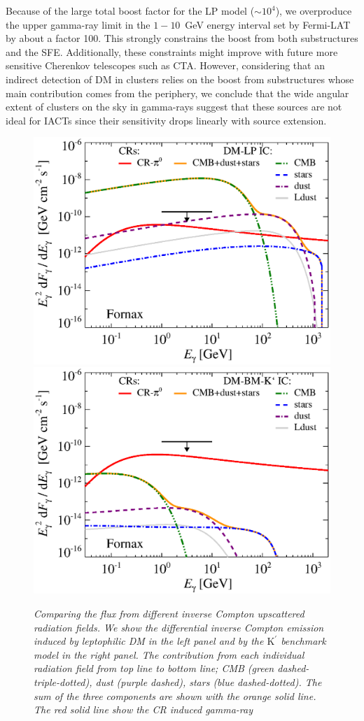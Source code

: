 \documentclass[10pt,aps,pra,reprint,amsmath,amsfonts,amssymb,showpacs,nofootinbib,floatfix]{revtex4-1}
\newcommand{\rmn}{\mathrm}
\newcommand{\Kp}{\rmn{K}^\prime}
\begin{document}
Because of the large total boost factor for the LP model ($\sim
10^4$), we overproduce the upper gamma-ray limit in the $1-10$~GeV
energy interval set by Fermi-LAT by about a factor 100. This strongly
constrains the boost from both substructures and the
SFE. Additionally, these constraints might improve with future more
sensitive Cherenkov telescopes such as CTA. However, considering that
an indirect detection of DM in clusters relies on the boost from
substructures whose main contribution comes from the periphery, we
conclude that the wide angular extent of clusters on the sky in
gamma-rays suggest that these sources are not ideal for IACTs since
their sensitivity drops linearly with source extension.

\begin{figure}
\begin{minipage}{2.0\columnwidth}
\includegraphics[width=0.49\columnwidth]{figures/flux.IRcomp.v11.0.1deg.1.6T.SubMass.elmu.SF300.noMW.woGal.eps}
\includegraphics[width=0.49\columnwidth]{figures/flux.IRcomp.BMv11.0.1deg.SubMass.noMW.woGal.eps}
\caption{\it Comparing the flux from different inverse Compton
  upscattered radiation fields. We show the differential inverse
  Compton emission induced by leptophilic DM in the left panel and by
  the $\Kp$ benchmark model in the right panel. The contribution from
  each individual radiation field from top line to bottom line; CMB
  (green dashed-triple-dotted), dust (purple dashed), stars (blue
  dashed-dotted). The sum of the three components are shown with the
  orange solid line.  The red solid line show the CR induced gamma-ray
}
\end{minipage}
\end{figure}
\end{document}
